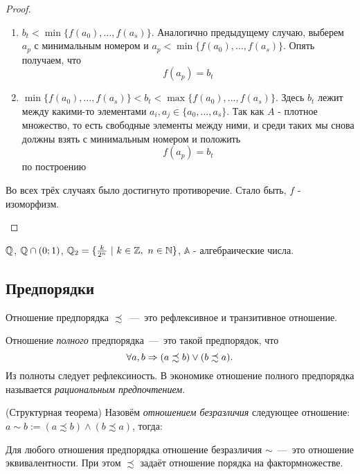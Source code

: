 \begin{proof}
\begin{enumerate}
\begin{enumerate}
			\item $b_t < \min \{f(a_0), \ldots, f(a_s)\}$. Аналогично предыдущему случаю, выберем $a_p$ с минимальным номером и $a_p < \min \{f(a_0), \ldots, f(a_s)\}$. Опять получаем, что
			\[
				f(a_p) = b_t
			\]
			
			\item $\min \{f(a_0), \ldots, f(a_s)\} < b_t < \max \{f(a_0), \ldots, f(a_s)\}$. Здесь $b_t$ лежит между какими-то элементами $a_i, a_j \in \{a_0, \ldots, a_s\}$. Так как $A$ - плотное множество, то есть свободные элементы между ними, и среди таких мы снова должны взять с минимальным номером и положить
			\[
				f(a_p) = b_t
			\]
			по построению
		\end{enumerate}
		Во всех трёх случаях было достигнуто противоречие. Стало быть, $f$ - изоморфизм.
	\end{enumerate}
\end{proof}

\begin{example}
	$\mathbb{Q}$, $\mathbb{Q} \cap (0;1)$, $\Q_2 = \{\frac{k}{2^n}\ |\ k \in \Z,\ n \in \N\}$, $\mathbb{A}$ - алгебраические числа.
\end{example}

\subsection{Предпорядки}

\begin{definition}
	Отношение предпорядка $\precsim$~---~это рефлексивное и транзитивное отношение.
\end{definition}

\begin{definition}
	Отношение \textit{полного} предпорядка~---~это такой предпорядок, что
	$$
		\forall a, b \Rightarrow (a \precsim b) \vee (b \precsim a).
	$$
	Из полноты следует рефлексиность. В экономике отношение полного предпорядка называется \textit{рациональным предпочтением}.
\end{definition}

\begin{theorem} (Структурная теорема)
	Назовём \textit{отношением безразличия} следующее отношение: 
	$a \sim b := (a \precsim b) \wedge (b \precsim a)$, тогда:
	
	Для любого отношения предпорядка отношение безразличия $\sim$~---~это отношение эквивалентности. При этом $\precsim$ задаёт отношение порядка на фактормножестве.
\end{theorem}

